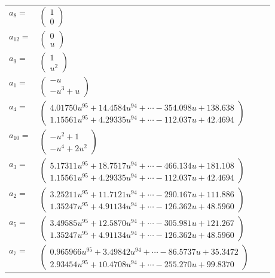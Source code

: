 \documentclass[1p]{elsarticle_modified}
\theoremstyle{definition}
\begin{document}
\begin{tabular}{m{7pt} m{180pt} m{7pt} m{180pt} }
\flushright $a_{8}=$&$\begin{pmatrix}1\\0\end{pmatrix}$ \\
\flushright $a_{12}=$&$\begin{pmatrix}0\\u\end{pmatrix}$ \\
\flushright $a_{9}=$&$\begin{pmatrix}1\\u^2\end{pmatrix}$ \\
\flushright $a_{1}=$&$\begin{pmatrix}- u\\- u^3+u\end{pmatrix}$ \\
\flushright $a_{4}=$&$\begin{pmatrix}4.01750 u^{95}+14.4584 u^{94}+\cdots-354.098 u+138.638\\1.15561 u^{95}+4.29335 u^{94}+\cdots-112.037 u+42.4694\end{pmatrix}$ \\
\flushright $a_{10}=$&$\begin{pmatrix}- u^2+1\\- u^4+2 u^2\end{pmatrix}$ \\
\flushright $a_{3}=$&$\begin{pmatrix}5.17311 u^{95}+18.7517 u^{94}+\cdots-466.134 u+181.108\\1.15561 u^{95}+4.29335 u^{94}+\cdots-112.037 u+42.4694\end{pmatrix}$ \\
\flushright $a_{2}=$&$\begin{pmatrix}3.25211 u^{95}+11.7121 u^{94}+\cdots-290.167 u+111.886\\1.35247 u^{95}+4.91134 u^{94}+\cdots-126.362 u+48.5960\end{pmatrix}$ \\
\flushright $a_{5}=$&$\begin{pmatrix}3.49585 u^{95}+12.5870 u^{94}+\cdots-305.981 u+121.267\\1.35247 u^{95}+4.91134 u^{94}+\cdots-126.362 u+48.5960\end{pmatrix}$ \\
\flushright $a_{7}=$&$\begin{pmatrix}0.965966 u^{95}+3.49842 u^{94}+\cdots-86.5737 u+35.3472\\2.93454 u^{95}+10.4708 u^{94}+\cdots-255.270 u+99.8370\end{pmatrix}$ \\

\end{tabular}
\end{document}
